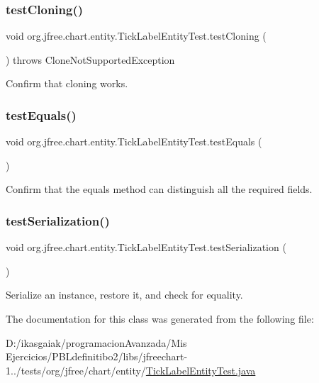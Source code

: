 \subsubsection{\texorpdfstring{test\+Cloning()}{testCloning()}}
{\footnotesize\ttfamily void org.\+jfree.\+chart.\+entity.\+Tick\+Label\+Entity\+Test.\+test\+Cloning (\begin{DoxyParamCaption}{ }\end{DoxyParamCaption}) throws Clone\+Not\+Supported\+Exception}

Confirm that cloning works. \mbox{\label{classorg_1_1jfree_1_1chart_1_1entity_1_1_tick_label_entity_test_a908aa15997b9084f83a2926382b9964f}} 
\subsubsection{\texorpdfstring{test\+Equals()}{testEquals()}}
{\footnotesize\ttfamily void org.\+jfree.\+chart.\+entity.\+Tick\+Label\+Entity\+Test.\+test\+Equals (\begin{DoxyParamCaption}{ }\end{DoxyParamCaption})}

Confirm that the equals method can distinguish all the required fields. \mbox{\label{classorg_1_1jfree_1_1chart_1_1entity_1_1_tick_label_entity_test_ad1d003a1c14d640bb30923b23ec4e15a}} 
\subsubsection{\texorpdfstring{test\+Serialization()}{testSerialization()}}
{\footnotesize\ttfamily void org.\+jfree.\+chart.\+entity.\+Tick\+Label\+Entity\+Test.\+test\+Serialization (\begin{DoxyParamCaption}{ }\end{DoxyParamCaption})}

Serialize an instance, restore it, and check for equality. 

The documentation for this class was generated from the following file\+:\begin{DoxyCompactItemize}
\item 
D\+:/ikasgaiak/programacion\+Avanzada/\+Mis Ejercicios/\+P\+B\+Ldefinitibo2/libs/jfreechart-\/1../tests/org/jfree/chart/entity/\mbox{\hyperlink{_tick_label_entity_test_8java}{Tick\+Label\+Entity\+Test.\+java}}\end{DoxyCompactItemize}
